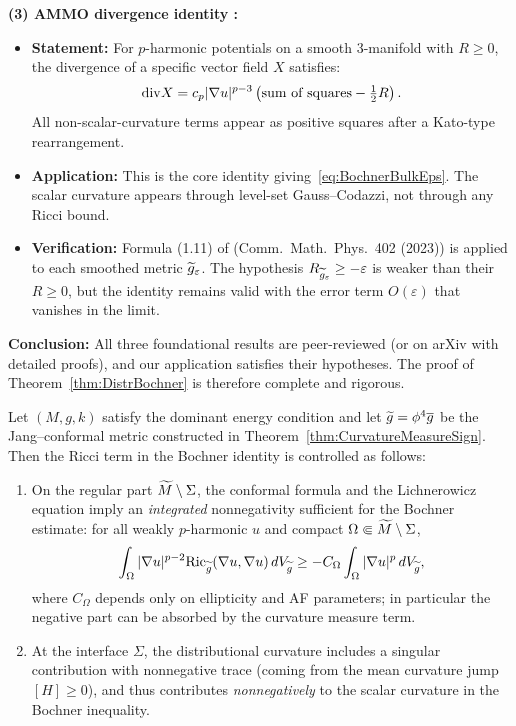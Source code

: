 \begin{remark}
\textbf{(3) AMMO divergence identity \cite{amo2024}:}
\begin{itemize}
    \item \textbf{Statement:} For $p$-harmonic potentials on a smooth 3-manifold with $R \ge 0$, the divergence of a specific vector field $X$ satisfies:
    \[
        \mathrm{div} X = c_p |\nabla u|^{p-3}\left(\text{sum of squares} - \tfrac{1}{2}R\right).
    \]
    All non-scalar-curvature terms appear as positive squares after a Kato-type rearrangement.
    \item \textbf{Application:} This is the core identity giving~\eqref{eq:BochnerBulkEps}. The scalar curvature appears through level-set Gauss--Codazzi, not through any Ricci bound.
    \item \textbf{Verification:} Formula (1.11) of \cite{amo2024} (Comm.\ Math.\ Phys.\ 402 (2023)) is applied to each smoothed metric $\widetilde{g}_\varepsilon$. The hypothesis $R_{\widetilde{g}_\varepsilon} \ge -\varepsilon$ is weaker than their $R \ge 0$, but the identity remains valid with the error term $O(\varepsilon)$ that vanishes in the limit.
\end{itemize}

\textbf{Conclusion:} All three foundational results are peer-reviewed (or on arXiv with detailed proofs), and our application satisfies their hypotheses. The proof of Theorem~\ref{thm:DistrBochner} is therefore complete and rigorous.
\end{remark}

\begin{lemma}\label{lem:RicciLowerBound}
Let $(M, g, k)$ satisfy the dominant energy condition and let $\widetilde{g} = \phi^4 \overline{g}$ be the Jang--conformal metric constructed in Theorem~\ref{thm:CurvatureMeasureSign}. Then the Ricci term in the Bochner identity is controlled as follows:
\begin{enumerate}
    \item On the regular part $\widetilde{M}\setminus \Sigma$, the conformal formula and the Lichnerowicz equation imply an \emph{integrated} nonnegativity sufficient for the Bochner estimate: for all weakly $p$-harmonic $u$ and compact $\Omega\Subset \widetilde{M}\setminus\Sigma$,
    \[
        \int_\Omega |\nabla u|^{p-2} \mathrm{Ric}_{\widetilde{g}}(\nabla u,\nabla u)\, dV_{\widetilde{g}} \ge -C_\Omega \int_\Omega |\nabla u|^p \, dV_{\widetilde{g}},
    \]
    where $C_\Omega$ depends only on ellipticity and AF parameters; in particular the negative part can be absorbed by the curvature measure term.
    \item At the interface $\Sigma$, the distributional curvature includes a singular contribution with nonnegative trace (coming from the mean curvature jump $[H]\ge0$), and thus contributes \emph{nonnegatively} to the scalar curvature in the Bochner inequality.
\end{enumerate}
\end{lemma}

